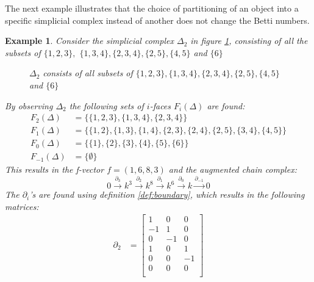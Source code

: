 \documentclass[11pt,a4paper,twoside]{report}
\newtheorem{myex}[mythm]{Example}
\begin{document}
The next example illustrates that the choice of partitioning of an object into a specific simplicial complex instead of another does not change the Betti numbers.
\begin{myex}
Consider the simplicial complex $\Delta_2$ in figure \ref{fig:ex2}, consisting of all the subsets of $\{1,2,3\},$ $\{1,3,4\},\{2,3,4\},\{2,5\},\{4,5\}$ and $\{6\}$
\begin{figure}[H]
\center
{}
\caption{$\Delta_2$ consists of all subsets of $\{1,2,3\},\{1,3,4\},\{2,3,4\},\{2,5\},\{4,5\}$ and $\{6\}$}
\label{fig:ex2}
\end{figure}
By observing $\Delta_2$ the following sets of $i$-faces  $F_i(\Delta)$ are found:
\begin{align*}
F_2(\Delta) &= \{\{1,2,3\},\{1,3,4\},\{2,3,4\}\}\\
F_1(\Delta) &= \{\{1,2\},\{1,3\},\{1,4\},\{2,3\},\{2,4\},\{2,5\},\{3,4\},\{4,5\}\}\\
F_0(\Delta) &= \{\{1\},\{2\},\{3\},\{4\},\{5\},\{6\}\}\\
F_{-1}(\Delta) &= \{\emptyset\}
\end{align*}
This results in the f-vector $f=(1,6,8,3)$ and the augmented chain complex:
\begin{equation*}
0\overset{\partial_3}{\longrightarrow} k^3\overset{\partial_2}{\longrightarrow} k^8\overset{\partial_1}{\longrightarrow} k^6\overset{\partial_0}{\longrightarrow} k \overset{\partial_{-1}}{\longrightarrow} 0
\end{equation*}
The $\partial_i$'s are found using definition \ref{def:boundary}, which results in the following matrices:
\begin{align*}
\partial_2&=
\begin{bmatrix}
1 & 0 & 0 \\
-1 & 1 & 0 \\
0 & -1 & 0 \\
1 & 0 & 1 \\
0 & 0 & -1 \\
0 & 0 & 0 \\

\end{bmatrix}
\end{align*}
\end{myex}
\end{document}
